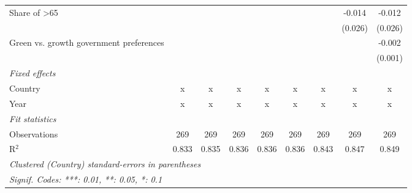 \begin{table}[htbp]
\begin{tabular}{lcccccccc}
      Share of >65                            &         &         &         &         &         &         & -0.014  & -0.012\\   
                                              &         &         &         &         &         &         & (0.026) & (0.026)\\   
      Green vs. growth government preferences &         &         &         &         &         &         &         & -0.002\\   
                                              &         &         &         &         &         &         &         & (0.001)\\   
      \emph{Fixed effects}\\
      Country                                 & x       & x       & x       & x       & x       & x       & x       & x\\  
      Year                                    & x       & x       & x       & x       & x       & x       & x       & x\\  
      \midrule \emph{Fit statistics}\\
      Observations                            & 269     & 269     & 269     & 269     & 269     & 269     & 269     & 269\\  
      R$^2$                                   & 0.833   & 0.835   & 0.836   & 0.836   & 0.836   & 0.843   & 0.847   & 0.849\\  
      \midrule
      \multicolumn{9}{l}{\emph{Clustered (Country) standard-errors in parentheses}}\\
      \multicolumn{9}{l}{\emph{Signif. Codes: ***: 0.01, **: 0.05, *: 0.1}}\\
   \end{tabular}
\end{table}


